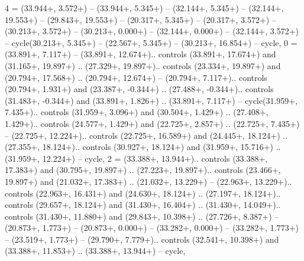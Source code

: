 {4} = {(33.944+\ctpXshift, 3.572+\ctpYshift) -- (33.944+\ctpXshift, 5.345+\ctpYshift) -- (32.144+\ctpXshift, 5.345+\ctpYshift) -- (32.144+\ctpXshift, 19.553+\ctpYshift) -- (29.843+\ctpXshift, 19.553+\ctpYshift) -- (20.317+\ctpXshift, 5.345+\ctpYshift) -- (20.317+\ctpXshift, 3.572+\ctpYshift) -- (30.213+\ctpXshift, 3.572+\ctpYshift) -- (30.213+\ctpXshift, 0.000+\ctpYshift) -- (32.144+\ctpXshift, 0.000+\ctpYshift) -- (32.144+\ctpXshift, 3.572+\ctpYshift) -- cycle(30.213+\ctpXshift, 5.345+\ctpYshift) -- (22.567+\ctpXshift, 5.345+\ctpYshift) -- (30.213+\ctpXshift, 16.854+\ctpYshift) -- cycle},
{0} = {(33.891+\ctpXshift, 7.117+\ctpYshift) -- (33.891+\ctpXshift, 12.674+\ctpYshift).. controls (33.891+\ctpXshift, 17.674+\ctpYshift) and (31.165+\ctpXshift, 19.897+\ctpYshift) .. (27.329+\ctpXshift, 19.897+\ctpYshift).. controls (23.334+\ctpXshift, 19.897+\ctpYshift) and (20.794+\ctpXshift, 17.568+\ctpYshift) .. (20.794+\ctpXshift, 12.674+\ctpYshift) -- (20.794+\ctpXshift, 7.117+\ctpYshift).. controls (20.794+\ctpXshift, 1.931+\ctpYshift) and (23.387+\ctpXshift, -0.344+\ctpYshift) .. (27.488+\ctpXshift, -0.344+\ctpYshift).. controls (31.483+\ctpXshift, -0.344+\ctpYshift) and (33.891+\ctpXshift, 1.826+\ctpYshift) .. (33.891+\ctpXshift, 7.117+\ctpYshift) -- cycle(31.959+\ctpXshift, 7.435+\ctpYshift).. controls (31.959+\ctpXshift, 3.096+\ctpYshift) and (30.504+\ctpXshift, 1.429+\ctpYshift) .. (27.408+\ctpXshift, 1.429+\ctpYshift).. controls (24.577+\ctpXshift, 1.429+\ctpYshift) and (22.725+\ctpXshift, 2.857+\ctpYshift) .. (22.725+\ctpXshift, 7.435+\ctpYshift) -- (22.725+\ctpXshift, 12.224+\ctpYshift).. controls (22.725+\ctpXshift, 16.589+\ctpYshift) and (24.445+\ctpXshift, 18.124+\ctpYshift) .. (27.355+\ctpXshift, 18.124+\ctpYshift).. controls (30.927+\ctpXshift, 18.124+\ctpYshift) and (31.959+\ctpXshift, 15.716+\ctpYshift) .. (31.959+\ctpXshift, 12.224+\ctpYshift) -- cycle},
{2} = {(33.388+\ctpXshift, 13.944+\ctpYshift).. controls (33.388+\ctpXshift, 17.383+\ctpYshift) and (30.795+\ctpXshift, 19.897+\ctpYshift) .. (27.223+\ctpXshift, 19.897+\ctpYshift).. controls (23.466+\ctpXshift, 19.897+\ctpYshift) and (21.032+\ctpXshift, 17.383+\ctpYshift) .. (21.032+\ctpXshift, 13.229+\ctpYshift) -- (22.963+\ctpXshift, 13.229+\ctpYshift).. controls (22.963+\ctpXshift, 16.431+\ctpYshift) and (24.630+\ctpXshift, 18.124+\ctpYshift) .. (27.197+\ctpXshift, 18.124+\ctpYshift).. controls (29.657+\ctpXshift, 18.124+\ctpYshift) and (31.430+\ctpXshift, 16.404+\ctpYshift) .. (31.430+\ctpXshift, 14.049+\ctpYshift).. controls (31.430+\ctpXshift, 11.880+\ctpYshift) and (29.843+\ctpXshift, 10.398+\ctpYshift) .. (27.726+\ctpXshift, 8.387+\ctpYshift) -- (20.873+\ctpXshift, 1.773+\ctpYshift) -- (20.873+\ctpXshift, 0.000+\ctpYshift) -- (33.282+\ctpXshift, 0.000+\ctpYshift) -- (33.282+\ctpXshift, 1.773+\ctpYshift) -- (23.519+\ctpXshift, 1.773+\ctpYshift) -- (29.790+\ctpXshift, 7.779+\ctpYshift).. controls (32.541+\ctpXshift, 10.398+\ctpYshift) and (33.388+\ctpXshift, 11.853+\ctpYshift) .. (33.388+\ctpXshift, 13.944+\ctpYshift) -- cycle},
